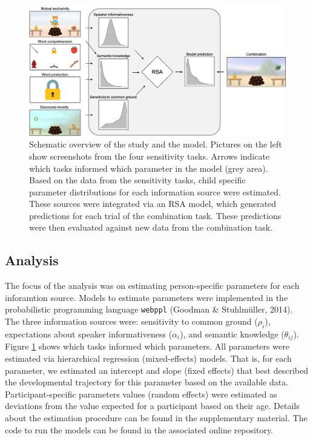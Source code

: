 \documentclass[
  man,floatsintext]{apa6}
\begin{document}
\begin{figure}
\includegraphics[width=1\linewidth]{./figures/fig1} \caption{Schematic overview of the study and the model. Pictures on the left show screenshots from the four sensitivity tasks. Arrows indicate which tasks informed which parameter in the model (grey area). Based on the data from the sensitivity tasks, child specific parameter distributions for each information source were estimated. These sources were integrated via an RSA model, which generated predictions for each trial of the combination task. These predictions were then evaluated against new data from the combination task.}\label{fig:fig1}
\end{figure}

\hypertarget{analysis}{%
\subsection{Analysis}\label{analysis}}

The focus of the analysis was on estimating person-specific parameters for each inforamtion source. Models to estimate parameters were implemented in the probabilistic programming language \texttt{webppl} (Goodman \& Stuhlmüller, 2014). The three information sources were: sensitivity to common ground (\(\rho_i\)), expectations about speaker informativeness (\(\alpha_i\)), and semantic knowledge (\(\theta_{ij}\)). Figure \ref{fig:fig1} shows which tasks informed which parameters. All parameters were estimated via hierarchical regression (mixed-effects) models. That is, for each parameter, we estimated an intercept and slope (fixed effects) that best described the developmental trajectory for this parameter based on the available data. Participant-specific parameters values (random effects) were estimated as deviations from the value expected for a participant based on their age. Details about the estimation procedure can be found in the supplementary material. The code to run the models can be found in the associated online repository.
\end{document}
